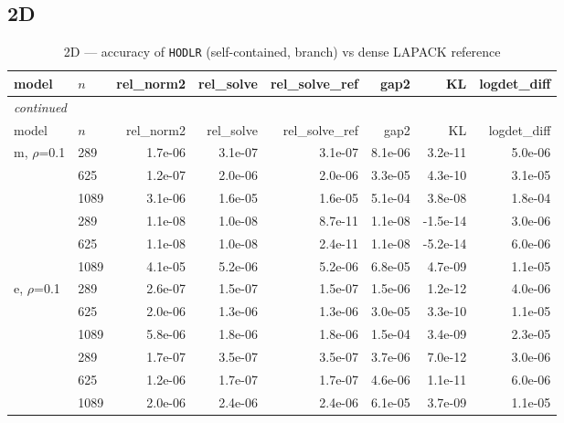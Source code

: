 \documentclass[11pt,a4paper]{article}
\begin{document}
\subsection{2D}
\small\begin{center}
\begin{longtable}{llrrrrrr}
\caption{2D --- accuracy of \texttt{HODLR} (self-contained, branch) vs dense LAPACK reference}
\\\toprule
model & $n$ & rel\_norm2 & rel\_solve & rel\_solve\_ref & gap2 & KL & logdet\_diff\\
\midrule
\endfirsthead
\multicolumn{8}{l}{\small\emph{continued}}\\
\toprule
model & $n$ & rel\_norm2 & rel\_solve & rel\_solve\_ref & gap2 & KL & logdet\_diff\\
\midrule
\endhead

m, $\rho$=0.1 & 289 & 1.7e-06 & 3.1e-07 & 3.1e-07 & 8.1e-06 & 3.2e-11 & 5.0e-06\\
 & 625 & 1.2e-07 & 2.0e-06 & 2.0e-06 & 3.3e-05 & 4.3e-10 & 3.1e-05\\
 & 1089 & 3.1e-06 & 1.6e-05 & 1.6e-05 & 5.1e-04 & 3.8e-08 & 1.8e-04\\
 & 289 & 1.1e-08 & 1.0e-08 & 8.7e-11 & 1.1e-08 & -1.5e-14 & 3.0e-06\\
 & 625 & 1.1e-08 & 1.0e-08 & 2.4e-11 & 1.1e-08 & -5.2e-14 & 6.0e-06\\
 & 1089 & 4.1e-05 & 5.2e-06 & 5.2e-06 & 6.8e-05 & 4.7e-09 & 1.1e-05\\
e, $\rho$=0.1 & 289 & 2.6e-07 & 1.5e-07 & 1.5e-07 & 1.5e-06 & 1.2e-12 & 4.0e-06\\
 & 625 & 2.0e-06 & 1.3e-06 & 1.3e-06 & 3.0e-05 & 3.3e-10 & 1.1e-05\\
 & 1089 & 5.8e-06 & 1.8e-06 & 1.8e-06 & 1.5e-04 & 3.4e-09 & 2.3e-05\\
 & 289 & 1.7e-07 & 3.5e-07 & 3.5e-07 & 3.7e-06 & 7.0e-12 & 3.0e-06\\
 & 625 & 1.2e-06 & 1.7e-07 & 1.7e-07 & 4.6e-06 & 1.1e-11 & 6.0e-06\\
 & 1089 & 2.0e-06 & 2.4e-06 & 2.4e-06 & 6.1e-05 & 3.7e-09 & 1.1e-05\\
\bottomrule\end{longtable}\end{center}
\end{document}
